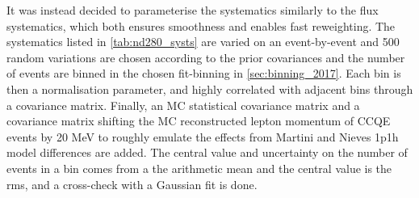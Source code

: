 It was instead decided to parameterise the systematics similarly to the flux systematics, which both ensures smoothness and enables fast reweighting. The systematics listed in \autoref{tab:nd280_systs} are varied on an event-by-event and 500 random variations are chosen according to the prior covariances and the number of events are binned in the chosen fit-binning in \autoref{sec:binning_2017}. Each bin is then a normalisation parameter, and highly correlated with adjacent bins through a covariance matrix. Finally, an MC statistical covariance matrix and a covariance matrix shifting the MC reconstructed lepton momentum of CCQE events by 20 MeV to roughly emulate the effects from Martini and Nieves 1p1h model differences are added\cite{t2k_2015}. The central value and uncertainty on the number of events in a bin comes from a the arithmetic mean and the central value is the rms, and a cross-check with a Gaussian fit is done.

